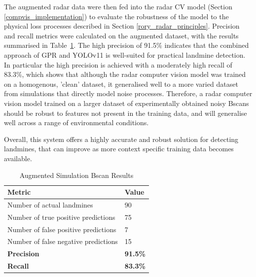         The augmented radar data were then fed into the radar CV model (Section \ref{compvis_implementation}) to evaluate the robustness of the model to the physical loss processes described in Section \ref{rory_radar_principles}. Precision and recall metrics were calculated on the augmented dataset, with the results summarised in Table~\ref{tab:cv_results}. The high precision of 91.5\% indicates that the combined approach of GPR and YOLOv11 is well-suited for practical landmine detection. In particular the high precision is achieved with a moderately high recall of 83.3\%, which shows that although the radar computer vision model was trained on a homogenous, 'clean' dataset, it generalised well to a more varied dataset from simulations that directly model noise processes. Therefore, a radar computer vision model trained on a larger dataset of experimentally obtained noisy Bscans should be robust to features not present in the training data, and will generalise well across a range of environmental conditions.

        Overall, this system offers a highly accurate and robust solution for detecting landmines, that can improve as more context specific training data becomes available.

        \begin{table}[htbp]
          \centering
          \caption{Augmented Simulation Bscan Results}
          \label{tab:cv_results}
          \begin{tabular}{@{} l l @{}} 
            \toprule
            \textbf{Metric} & \textbf{Value} \\
            \midrule
            Number of actual landmines & 90 \\
            Number of true positive predictions & 75 \\
            Number of false positive predictions & 7 \\
            Number of false negative predictions &  15\\
            \midrule
            \textbf{Precision} &  \textbf{91.5\%}\\
            \textbf{Recall} & \textbf{83.3\%}\\
            \bottomrule
          \end{tabular}
        \end{table}       
        